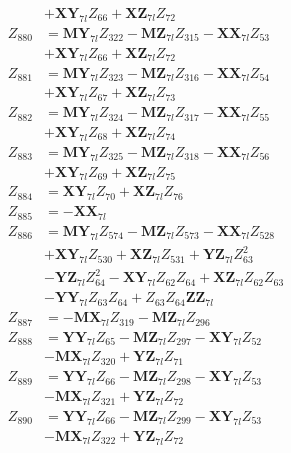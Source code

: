 \begin{multicols}{2}
\begin{align}
&+ \mathbf{XY}_{7l}Z_{66} + \mathbf{XZ}_{7l}Z_{72} \nonumber \\
Z_{880} &= \mathbf{MY}_{7l}Z_{322} - \mathbf{MZ}_{7l}Z_{315} - \mathbf{XX}_{7l}Z_{53}  \nonumber \\
&+ \mathbf{XY}_{7l}Z_{66} + \mathbf{XZ}_{7l}Z_{72} \nonumber \\
Z_{881} &= \mathbf{MY}_{7l}Z_{323} - \mathbf{MZ}_{7l}Z_{316} - \mathbf{XX}_{7l}Z_{54}  \nonumber \\
&+ \mathbf{XY}_{7l}Z_{67} + \mathbf{XZ}_{7l}Z_{73} \nonumber \\
Z_{882} &= \mathbf{MY}_{7l}Z_{324} - \mathbf{MZ}_{7l}Z_{317} - \mathbf{XX}_{7l}Z_{55}  \nonumber \\
&+ \mathbf{XY}_{7l}Z_{68} + \mathbf{XZ}_{7l}Z_{74} \nonumber \\
Z_{883} &= \mathbf{MY}_{7l}Z_{325} - \mathbf{MZ}_{7l}Z_{318} - \mathbf{XX}_{7l}Z_{56}  \nonumber \\
&+ \mathbf{XY}_{7l}Z_{69} + \mathbf{XZ}_{7l}Z_{75} \nonumber \\
Z_{884} &= \mathbf{XY}_{7l}Z_{70} + \mathbf{XZ}_{7l}Z_{76} \nonumber \\
Z_{885} &= -\mathbf{XX}_{7l} \nonumber \\
Z_{886} &= \mathbf{MY}_{7l}Z_{574} - \mathbf{MZ}_{7l}Z_{573} - \mathbf{XX}_{7l}Z_{528}  \nonumber \\
&+ \mathbf{XY}_{7l}Z_{530} + \mathbf{XZ}_{7l}Z_{531} + \mathbf{YZ}_{7l}Z_{63}^2  \nonumber \\
&- \mathbf{YZ}_{7l}Z_{64}^2 - \mathbf{XY}_{7l}Z_{62}Z_{64} + \mathbf{XZ}_{7l}Z_{62}Z_{63}  \nonumber \\
&- \mathbf{YY}_{7l}Z_{63}Z_{64} + Z_{63}Z_{64}\mathbf{ZZ}_{7l} \nonumber \\
Z_{887} &= - \mathbf{MX}_{7l}Z_{319} - \mathbf{MZ}_{7l}Z_{296} \nonumber \\
Z_{888} &= \mathbf{YY}_{7l}Z_{65} - \mathbf{MZ}_{7l}Z_{297} - \mathbf{XY}_{7l}Z_{52}  \nonumber \\
&- \mathbf{MX}_{7l}Z_{320} + \mathbf{YZ}_{7l}Z_{71} \nonumber \\
Z_{889} &= \mathbf{YY}_{7l}Z_{66} - \mathbf{MZ}_{7l}Z_{298} - \mathbf{XY}_{7l}Z_{53}  \nonumber \\
&- \mathbf{MX}_{7l}Z_{321} + \mathbf{YZ}_{7l}Z_{72} \nonumber \\
Z_{890} &= \mathbf{YY}_{7l}Z_{66} - \mathbf{MZ}_{7l}Z_{299} - \mathbf{XY}_{7l}Z_{53}  \nonumber \\
&- \mathbf{MX}_{7l}Z_{322} + \mathbf{YZ}_{7l}Z_{72} \nonumber \\

\end{align}
\end{multicols}
